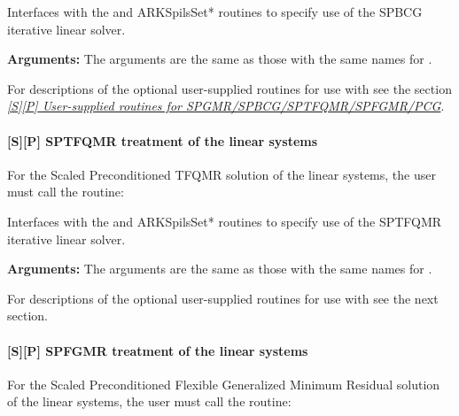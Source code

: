 \documentclass[letterpaper,10pt,english]{sphinxmanual}
\begin{document}
\begin{fulllineitems}
\label{f_interface/Usage:f/_/FARKSPBCG}
Interfaces with the {\hyperref[c_interface/User_callable:ARKSpbcg]{}} and
ARKSpilsSet* routines to specify use of the SPBCG iterative
linear solver.

\textbf{Arguments:}  The arguments are the same as those with the
same names for {\hyperref[f_interface/Usage:f/_/FARKSPGMR]{}}.

\end{fulllineitems}


For descriptions of the optional user-supplied routines for use with
{\hyperref[f_interface/Usage:f/_/FARKSPBCG]{}} see the section {\hyperref[f_interface/Usage:finterface-spilsusersupplied]{\emph{{[}S{]}{[}P{]} User-supplied routines for SPGMR/SPBCG/SPTFQMR/SPFGMR/PCG}}}.


\paragraph{{[}\textbf{S}{]}{[}\textbf{P}{]} SPTFQMR treatment of the linear systems}
\label{f_interface/Usage:s-p-sptfqmr-treatment-of-the-linear-systems}
For the Scaled Preconditioned TFQMR solution of the linear systems,
the user must call the {\hyperref[f_interface/Usage:f/_/FARKSPTFQMR]{}} routine:

\begin{fulllineitems}
\label{f_interface/Usage:f/_/FARKSPTFQMR}
Interfaces with the {\hyperref[c_interface/User_callable:ARKSptfqmr]{}} and
ARKSpilsSet* routines to specify use of the SPTFQMR iterative
linear solver.

\textbf{Arguments:}  The arguments are the same as those with the same names
for {\hyperref[f_interface/Usage:f/_/FARKSPGMR]{}}.

\end{fulllineitems}


For descriptions of the optional user-supplied routines for use with
{\hyperref[f_interface/Usage:f/_/FARKSPTFQMR]{}} see the next section.


\paragraph{{[}\textbf{S}{]}{[}\textbf{P}{]} SPFGMR treatment of the linear systems}
\label{f_interface/Usage:s-p-spfgmr-treatment-of-the-linear-systems}
For the Scaled Preconditioned Flexible Generalized Minimum Residual
solution of the linear systems, the user must call the
{\hyperref[f_interface/Usage:f/_/FARKSPFGMR]{}} routine:
\end{document}
